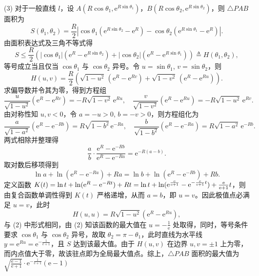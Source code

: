 \begin{solution}
\[\]
(3) 对于一般直线 $l$，设 $A(R\cos\theta_1, \mathrm{e}^{R\sin\theta_1})$，$B(R\cos\theta_2, \mathrm{e}^{R\sin\theta_2})$，则 $\triangle PAB$ 面积为
\[
S(\theta_1,\theta_2) = \frac{R}{2}\left| \cos\theta_1 (\mathrm{e}^{R\sin\theta_2} - \mathrm{e}^{R}) - \cos\theta_2 (\mathrm{e}^{R\sin\theta_1} - \mathrm{e}^{R}) \right|.
\]
由面积表达式及三角不等式得
\[
S \le \frac{R}{2} \left( |\cos\theta_1| (\mathrm{e}^{R} - \mathrm{e}^{R\sin\theta_2}) + |\cos\theta_2| (\mathrm{e}^{R} - \mathrm{e}^{R\sin\theta_1}) \right) \triangleq H(\theta_1,\theta_2),
\]
等号成立当且仅当 \(\cos\theta_1\) 与 \(\cos\theta_2\) 异号。令 \(u=\sin\theta_1\), \(v=\sin\theta_2\)，则
\[
H(u,v) = \frac{R}{2} \left( \sqrt{1-u^2}\,(\mathrm{e}^{R} - \mathrm{e}^{Rv}) + \sqrt{1-v^2}\,(\mathrm{e}^{R} - \mathrm{e}^{Ru}) \right).
\]
求偏导数并令其为零，得到方程组
\[
\frac{u}{\sqrt{1-u^2}}(\mathrm{e}^{R} - \mathrm{e}^{Rv}) = -R\sqrt{1-v^2}\,\mathrm{e}^{Ru}, \quad
\frac{v}{\sqrt{1-v^2}}(\mathrm{e}^{R} - \mathrm{e}^{Ru}) = -R\sqrt{1-u^2}\,\mathrm{e}^{Rv}.
\]
由对称性知 \(u,v<0\)，令 \(a=-u>0\), \(b=-v>0\)，则方程组化为
\[
\frac{a}{\sqrt{1-a^2}}(\mathrm{e}^{R} - \mathrm{e}^{-Rb}) = R\sqrt{1-b^2}\,\mathrm{e}^{-Ra}, \quad
\frac{b}{\sqrt{1-b^2}}(\mathrm{e}^{R} - \mathrm{e}^{-Ra}) = R\sqrt{1-a^2}\,\mathrm{e}^{-Rb}.
\]
两式相除并整理得
\[
\frac{a}{b} \cdot \frac{\mathrm{e}^{R} - \mathrm{e}^{-Rb}}{\mathrm{e}^{R} - \mathrm{e}^{-Ra}} = \mathrm{e}^{-R(a-b)}.
\]
取对数后移项得到
\[
\ln a + \ln(\mathrm{e}^{R} - \mathrm{e}^{-Ra}) + Ra = \ln b + \ln(\mathrm{e}^{R} - \mathrm{e}^{-Rb}) + Rb.
\]
定义函数 \(K(t)=\ln t + \ln(\mathrm{e}^{R} - \mathrm{e}^{-Rt}) + Rt=\ln t + \ln(\mathrm{e}^{\frac{\mathrm{e}}{\mathrm{e}+1}} - \mathrm{e}^{-\frac{\mathrm{e}}{\mathrm{e}+1}t}) + \frac{\mathrm{e}}{\mathrm{e}+1}t\)，则由复合函数单调性得到 \(K(t)\) 严格递增，从而 \(a=b\)，即 \(u=v\)。因此极值点必满足 \(u=v\)，此时
\[
H(u,u)=R\sqrt{1-u^2}(\mathrm{e}^{R} - \mathrm{e}^{Ru}),
\]
与 (2) 中形式相同，由 (2) 知该函数的最大值在 $u = -\frac{1}{\mathrm{e}}$ 处取得，同时，等号条件要求 $\cos\theta_1$ 与 $\cos\theta_2$ 异号，故取 $\theta_2 = \pi - \theta_1$，此时直线为水平线 $y = \mathrm{e}^{Ru} = \mathrm{e}^{-\frac{1}{\mathrm{e}+1}}$，且 $S$ 达到该最大值。由于 $H(u,v)$ 在边界 $u,v=\pm1$ 上为零，而内点值大于零，故该驻点即为全局最大值点。综上，$\triangle PAB$ 面积的最大值为$\displaystyle  \sqrt{\frac{\mathrm{e}-1}{\mathrm{e}+1}} \cdot \mathrm{e}^{-\frac{1}{\mathrm{e}+1}}(\mathrm{e}-1) $
\end{solution}


